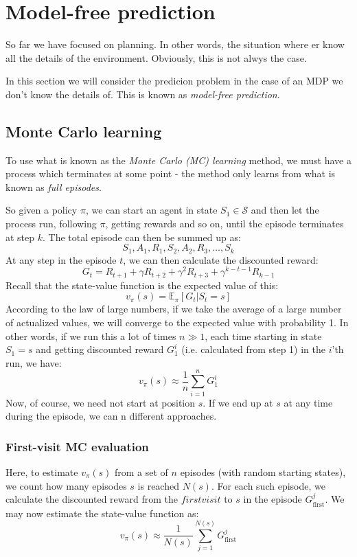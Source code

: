 \documentclass[12pt, a4paper]{article}
\numberwithin{equation}{section}
\begin{document}
\section{Model-free prediction}
So far we have focused on planning. In other words, the situation where er know all the details of the environment. Obviously, this is not alwys the case.

In this section we will consider the predicion problem in the case of an MDP we don't know the details of. This is known as \textit{model-free prediction}.

\subsection{Monte Carlo learning}
To use what is known as the \textit{Monte Carlo (MC) learning} method, we must have a process which terminates at some point - the method only learns from what is known as \textit{full episodes}.

So given a policy $\pi$, we can start an agent in state $S_1\in\mathcal{S}$ and then let the process run, following $\pi$, getting rewards and so on, until the episode terminates at step $k$. The total episode can then be summed up as:
\begin{equation}
S_1, A_1, R_1, S_2, A_2, R_3,\ldots,S_k
\end{equation}
At any step in the episode $t$, we can then calculate the discounted reward:
\begin{equation}
G_t=R_{t+1}+\gamma R_{t+2}+\gamma^2 R_{t+3}+\gamma^{k-t-1}R_{k-1}
\end{equation}
Recall that the state-value function is the expected value of this:
\begin{equation}
v_\pi(s)=\mathbb{E}_\pi[G_t|S_t=s]
\end{equation}
According to the law of large numbers, if we take the average of a large number of actualized values, we will converge to the expected value with probability 1. In other words, if we run this a lot of times $n\gg 1$, each time starting in state $S_1=s$ and getting discounted reward $G^i_1$ (i.e. calculated from step 1) in the $i$'th run, we have:
\begin{equation}
v_\pi(s)\approx\frac{1}{n}\sum_{i=1}^n G^i_1
\end{equation}
Now, of course, we need not start at position $s$. If we end up at $s$ at any time during the episode, we can n different approaches.

\subsubsection{First-visit MC evaluation}
Here, to estimate $v_\pi(s)$ from a set of $n$ episodes (with random starting states), we count how many episodes $s$ is reached $N(s)$. For each such episode, we calculate the discounted reward from the $first visit$ to $s$ in the episode $G^j_{\textrm{first}}$. We may now estimate the state-value function as:
\begin{equation}
v_\pi(s)\approx\frac{1}{N(s)}\sum_{j=1}^{N(s)} G^j_{\textrm{first}}
\end{equation}
\end{document}
